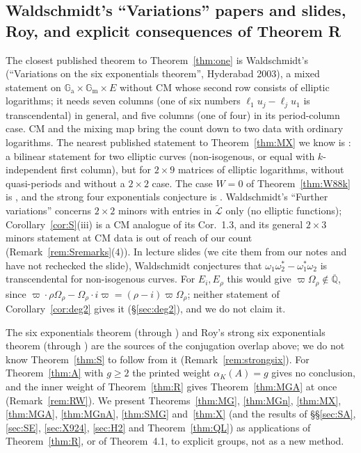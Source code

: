 \documentclass[11pt]{amsart}
\theoremstyle{definition}
\newcommand{\Qb}{\overline{\mathbb{Q}}}
\newcommand{\Ga}{\mathbb{G}_{\mathrm a}}
\newcommand{\Gm}{\mathbb{G}_{\mathrm m}}
\newcommand{\Lt}{\widetilde{\mathcal{L}}}
\newcommand{\vp}{\varpi}
\begin{document}
\subsection{Waldschmidt's ``Variations'' papers and slides, Roy, and explicit consequences of Theorem R}\label{sec:hyd}
The closest published theorem to Theorem~\ref{thm:one} is Waldschmidt's \cite[Thm.~4.2]{W05} (``Variations on the six
exponentials theorem'', Hyderabad 2003), a mixed statement on $\Ga\times\Gm\times E$ without CM whose second row consists of
elliptic logarithms; it needs seven columns (one of six numbers $\ell_1u_j-\ell_ju_1$ is transcendental) in general, and
five columns (one of four) in its period-column case. CM and the mixing map bring the count down to two data with ordinary
logarithms. The nearest published statement to Theorem~\ref{thm:MX} we know is \cite[Thm.~4.3]{W05}: a bilinear statement
for two elliptic curves (non-isogenous, or equal with $k$-independent first column), but for $2\times9$ matrices of
elliptic logarithms, without quasi-periods and without a $2\times2$ case. The case $W=0$ of Theorem~\ref{thm:W88k} is
\cite[Thm.~5.1]{W05}, and the strong four exponentials conjecture is \cite[Conj.~1.5]{W05}. Waldschmidt's ``Further
variations'' \cite{W05b} concerns $2\times2$ minors with entries in $\Lt$ only (no elliptic functions);
Corollary~\ref{cor:S}(iii) is a CM analogue of its Cor.~1.3, and its general $2\times3$ minors statement
\cite[Thm.~1.2]{W05b} at CM data is out of reach of our count (Remark~\ref{rem:Sremarks}(4)). In lecture slides
\cite{W03s} (we cite them from our notes and have not rechecked the slide), Waldschmidt conjectures that
$\omega_1\omega_2^*-\omega_1^*\omega_2$ is transcendental for non-isogenous curves. For $E_i,E_\rho$ this would give
$\vp\Omega_\rho\notin\Qb$, since $\vp\cdot\rho\Omega_\rho-\Omega_\rho\cdot i\vp=(\rho-i)\vp\Omega_\rho$; neither statement
of Corollary~\ref{cor:deg2} gives it (\S\ref{sec:deg2}), and we do not claim it.

The six exponentials theorem (through \cite[Cor.~2.7]{W07}) and Roy's strong six exponentials theorem
\cite[Cor.~2]{Roy92} (through \cite[Thm.~4.1]{W07}) are the sources of the conjugation overlap above; we do not know
Theorem~\ref{thm:S} to follow from it (Remark~\ref{rem:strongsix}). For Theorem~\ref{thm:A} with $g\ge2$ the printed weight
$\alpha_K(A)=g$ gives no conclusion, and the inner weight of Theorem~\ref{thm:R} gives Theorem~\ref{thm:MGA} at once
(Remark~\ref{rem:RW}). We present Theorems~\ref{thm:MG}, \ref{thm:MGn}, \ref{thm:MX}, \ref{thm:MGA}, \ref{thm:MGnA},
\ref{thm:SMG} and~\ref{thm:X} (and the results of \S\S\ref{sec:SA}, \ref{sec:SE}, \ref{sec:X924}, \ref{sec:H2} and
Theorem~\ref{thm:QL}) as applications of Theorem~\ref{thm:R}, or of Theorem~4.1, to explicit groups, not as a new method.
\end{document}
